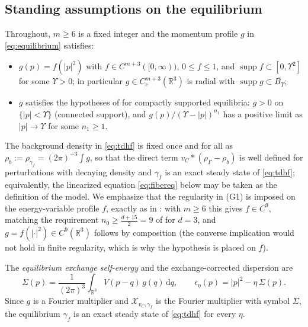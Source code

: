 \documentclass[11pt,a4paper]{amsart}
\theoremstyle{definition}
\theoremstyle{remark}
\newcommand{\R}{\mathbb{R}}
\newcommand{\supp}{\operatorname{supp}}
\newcommand{\dd}{\,\mathrm{d}}
\newcommand{\sX}{\mathcal{X}}
\begin{document}
\subsection{Standing assumptions on the equilibrium}\label{sec:standing}
Throughout, $m\ge6$ is a fixed integer and the momentum profile $g$ in \eqref{eq:equilibrium} satisfies:
\begin{itemize}
\item[(G1)] $g(p)=f(|p|^2)$ with $f\in C^{m+3}([0,\infty))$, $0\le f\le1$, and $\supp f\subset[0,\Upsilon^2]$ for some $\Upsilon>0$; in particular $g\in C^{m+3}_c(\R^3)$ is radial with $\supp g\subset\overline{B_\Upsilon}$;
\item[(G2)] $g$ satisfies the hypotheses of \cite[Section~1.4]{NY1} for compactly supported equilibria: $g>0$ on $\{|p|<\Upsilon\}$ (connected support), and $g(p)/(\Upsilon-|p|)^{n_1}$ has a positive limit as $|p|\to\Upsilon$ for some $n_1\ge1$.
\end{itemize}
The background density in \eqref{eq:tdhf} is fixed once and for all as $\rho_b:=\rho_{\gamma_f}=(2\pi)^{-3}\int g$, so that the direct term $v_C*(\rho_\Gamma-\rho_b)$ is well defined for perturbations with decaying density and $\gamma_f$ is an exact steady state of \eqref{eq:tdhf}; equivalently, the linearized equation \eqref{eq:fibereq} below may be taken as the definition of the model. We emphasize that the regularity in (G1) is imposed on the energy-variable profile $f$, exactly as in \cite[Section~1.4]{NY1}: with $m\ge6$ this gives $f\in C^{9}$, matching the requirement $n_0\ge\frac{d+15}{2}=9$ of \cite{NY1} for $d=3$, and $g=f(|\cdot|^2)\in C^{9}(\R^3)$ follows by composition (the converse implication would not hold in finite regularity, which is why the hypothesis is placed on $f$).

The \emph{equilibrium exchange self-energy} and the exchange-corrected dispersion are
\begin{equation}\label{eq:selfenergy}
\Sigma(p)=\frac{1}{(2\pi)^3}\int_{\R^3}V(p-q)\,g(q)\dd q,\qquad
\epsilon_\eta(p)=|p|^2-\eta\,\Sigma(p).
\end{equation}
Since $g$ is a Fourier multiplier and $\sX_{v_C,\gamma_f}$ is the Fourier multiplier with symbol $\Sigma$, the equilibrium $\gamma_f$ is an exact steady state of \eqref{eq:tdhf} for every $\eta$.
\end{document}
